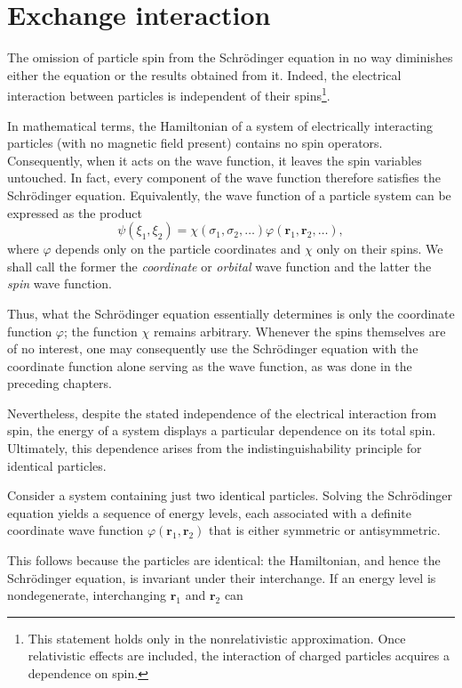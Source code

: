 \section{Exchange interaction}

The omission of particle spin from the Schrödinger equation in no way diminishes either the equation or the results obtained from it. Indeed, the electrical interaction between particles is independent of their spins\footnote{This statement holds only in the nonrelativistic approximation. Once relativistic effects are included, the interaction of charged particles acquires a dependence on spin.}.

In mathematical terms, the Hamiltonian of a system of electrically interacting particles (with no magnetic field present) contains no spin operators. Consequently, when it acts on the wave function, it leaves the spin variables untouched. In fact, every component of the wave function therefore satisfies the Schrödinger equation. Equivalently, the wave function of a particle system can be expressed as the product
\[
 \psi(\xi_1,\xi_2)=\chi(\sigma_1,\sigma_2,\ldots)\varphi(\mathbf r_1,\mathbf r_2,\ldots),
\]
where $\varphi$ depends only on the particle coordinates and $\chi$ only on their spins. We shall call the former the \emph{coordinate} or \emph{orbital} wave function and the latter the \emph{spin} wave function.

Thus, what the Schrödinger equation essentially determines is only the coordinate function $\varphi$; the function $\chi$ remains arbitrary. Whenever the spins themselves are of no interest, one may consequently use the Schrödinger equation with the coordinate function alone serving as the wave function, as was done in the preceding chapters.

Nevertheless, despite the stated independence of the electrical interaction from spin, the energy of a system displays a particular dependence on its total spin. Ultimately, this dependence arises from the indistinguishability principle for identical particles.

Consider a system containing just two identical particles. Solving the Schrödinger equation yields a sequence of energy levels, each associated with a definite coordinate wave function $\varphi(\mathbf r_1,\mathbf r_2)$ that is either symmetric or antisymmetric.

This follows because the particles are identical: the Hamiltonian, and hence the Schrödinger equation, is invariant under their interchange. If an energy level is nondegenerate, interchanging $\mathbf r_1$ and $\mathbf r_2$ can


